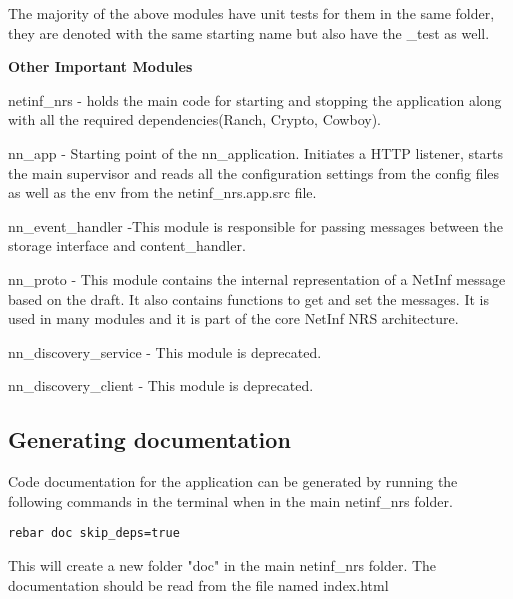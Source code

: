 The majority of the above modules have unit tests for them in the same folder, they are denoted with the same starting name but also have the \_test as well. 

\textbf{Other Important Modules}

netinf\_nrs - holds the main code for starting and stopping the application along with all the required dependencies(Ranch, Crypto, Cowboy).

nn\_app - Starting point of the nn\_application. Initiates a HTTP listener, starts the main supervisor and reads all the configuration settings from the config 
files as well as the env from the netinf\_nrs.app.src file.

nn\_event\_handler -This module is responsible for passing messages between the storage interface and content\_handler. 

nn\_proto - This module contains the internal representation of a NetInf message based on the draft. It also contains functions to get and set the messages. 
It is used in many modules and it is part of the core NetInf NRS architecture.

nn\_discovery\_service - This module is deprecated.

nn\_discovery\_client - This module is deprecated.


\subsection{Generating documentation}
\label{bdoc}
Code documentation for the application can be generated by running the following commands in the terminal when in the main netinf\_nrs folder.

\begin{verbatim}
rebar doc skip_deps=true
\end{verbatim}

This will create a new folder "doc" in the main netinf\_nrs folder. The documentation should be read from the file named index.html



